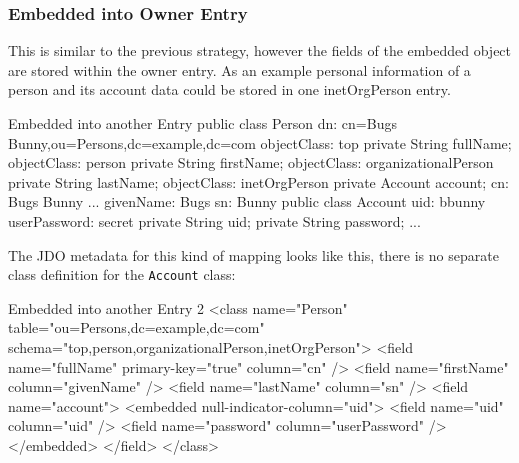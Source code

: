 \documentclass[a4paper,11pt,oneside]{article}
\begin{document}
\subsubsection{Embedded into Owner Entry}
This is similar to the previous strategy, however the fields of the embedded object are stored within the owner entry. As an example personal information of a person and its account data could be stored in one inetOrgPerson entry.
\begin{SaveVerbatim}{Embedded into another Entry}
public class Person                      dn: cn=Bugs Bunny,ou=Persons,dc=example,dc=com             
{                                        objectClass: top                                          
    private String fullName;             objectClass: person                                       
    private String firstName;            objectClass: organizationalPerson                         
    private String lastName;             objectClass: inetOrgPerson                                
    private Account account;             cn: Bugs Bunny                                                 
    ...                                  givenName: Bugs                                           
}                                        sn: Bunny                                                 
public class Account                     uid: bbunny                                               
{                                        userPassword: secret                                      
    private String uid;                                                                            
    private String password;                                                                       
    ...                                                                                            
}                                                                 
\end{SaveVerbatim}
\begin{figure}[htb]
\end{figure}
The JDO metadata for this kind of mapping looks like this, there is no separate class definition for the \texttt{Account} class:
\begin{SaveVerbatim}{Embedded into another Entry 2}
<class name="Person" table="ou=Persons,dc=example,dc=com" 
       schema="top,person,organizationalPerson,inetOrgPerson">
    <field name="fullName" primary-key="true" column="cn" />
    <field name="firstName" column="givenName" />
    <field name="lastName" column="sn" />
    <field name="account">
        <embedded null-indicator-column="uid">
            <field name="uid" column="uid" />
            <field name="password" column="userPassword" />
        </embedded>
    </field>
</class>
\end{SaveVerbatim}
\end{document}
